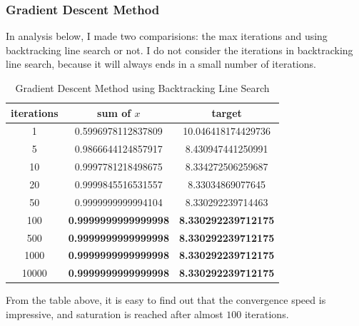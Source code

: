 \documentclass[12pt, a4paper, oneside]{article}
\begin{document}
\subsubsection{Gradient Descent Method}
In analysis below, I made two comparisions: the max iterations and using backtracking line search or not. I do not consider the iterations in backtracking line search, because it will always ends in a small number of iterations.
\begin{table}[H]
    \begin{center}
      \caption{Gradient Descent Method using Backtracking Line Search}
      \begin{tabular}{c|c|c} %
        \textbf{iterations} & \textbf{sum of $x$} & \textbf{target}\\
        \hline
        1 & 0.5996978112837809 & 10.046418174429736 \\
        5 & 0.9866644124857917 & 8.430947441250991 \\
        10 & 0.9997781218498675 & 8.334272506259687 \\
        20 & 0.9999845516531557 & 8.33034869077645 \\
        50 & 0.9999999999994104 & 8.330292239714463 \\
        100 & \textbf{0.9999999999999998} & \textbf{8.330292239712175} \\
        500 & \textbf{0.9999999999999998} & \textbf{8.330292239712175} \\
        1000 & \textbf{0.9999999999999998} & \textbf{8.330292239712175} \\
        10000 & \textbf{0.9999999999999998} & \textbf{8.330292239712175} 
      \end{tabular}
    \end{center}
\end{table}
From the table above, it is easy to find out that the convergence speed is impressive, and saturation is reached after almost $100$ iterations.
\end{document}
